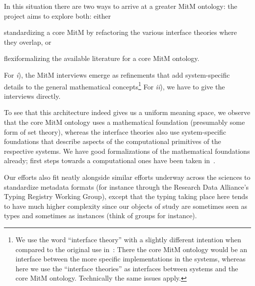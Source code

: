In this situation there are two ways to arrive at a greater MitM ontology: the \ODK
project aims to explore both: either
\begin{inparaenum}[\em i\rm)] 
\item standardizing a core MitM by refactoring the various interface theories where they
  overlap, or
\item flexiformalizing the available literature for a core MitM ontology.
\end{inparaenum}
For \emph{i}), the MitM interviews emerge as refinements that add system-specific details
to the general mathematical concepts\footnote{We use the word ``interface theory'' with a
  slightly different intention when compared to the original use
  in~\cite{KohRabSac:fvip11}: There the core MitM ontology would be an interface between
  the more specific implementations in the systems, whereas here we use the ``interface
  theories'' as interfaces between systems and the core MitM ontology. Technically the
  same issues apply.} For \emph{ii}), we have to give the interviews directly. 

To see that this architecture indeed gives us a uniform meaning space, we observe that the
core MitM ontology uses a mathematical foundation (presumably some form of set theory),
whereas the interface theories also use system-specific foundations that describe aspects
of the computational primitives of the respective systems. We have good formalizations of
the mathematical foundations already; first steps towards a computational ones have been
taken in~\cite{KohManRab:aumftg13}.

Our efforts also fit neatly alongside similar efforts underway across the sciences to
standardize metadata formats (for instance through the Research Data Alliance's Typing
Registry Working Group\cite{rda-typing}), except that the typing taking place here tends
to have much higher complexity since our objects of study are sometimes seen as types and
sometimes as instances (think of groups for instance). 


